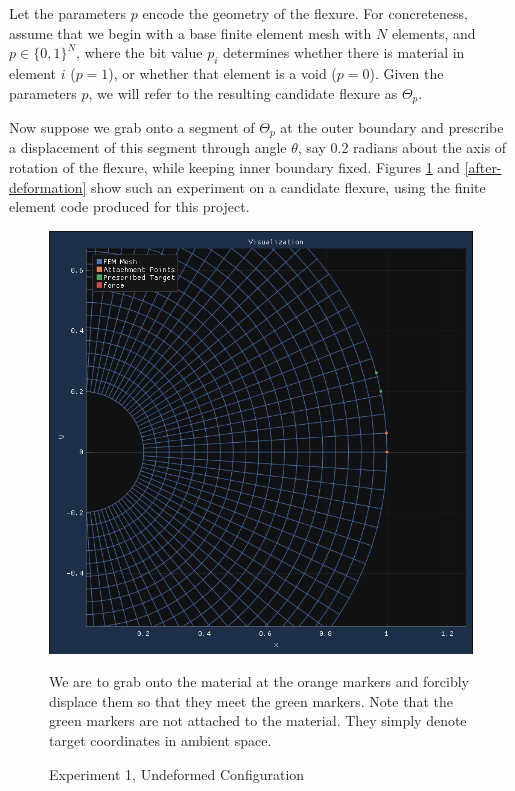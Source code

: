 \documentclass[11pt,letterpaper]{article}
\begin{document}
Let the parameters $p$ encode the geometry of the flexure. For concreteness, assume that we begin with a base finite element mesh with $N$ elements, and $p \in \{0, 1\}^N$, where the bit value $p_i$ determines whether there is material in element $i$ ($p=1$), or whether that element is a void ($p=0$). Given the parameters $p$, we will refer to the resulting candidate flexure as $\Theta_p$.

Now suppose we grab onto a segment of $\Theta_p$ at the outer boundary and prescribe a displacement of this segment through angle $\theta$, say 0.2 radians about the axis of rotation of the flexure, while keeping inner boundary fixed. Figures \ref{before-deformation} and \ref{after-deformation} show such an experiment on a candidate flexure, using the finite element code \cite{github} produced for this project.

\begin{figure}[H]
\begin{center}
\includegraphics[width=12cm, keepaspectratio]{before_deformation}
\caption{Experiment 1, Undeformed Configuration}
\label{before-deformation}
We are to grab onto the material at the orange markers and forcibly displace them so that they meet the green markers. Note that the green markers are not attached to the material. They simply denote target coordinates in ambient space.
\end{center}
\end{figure}
\end{document}
